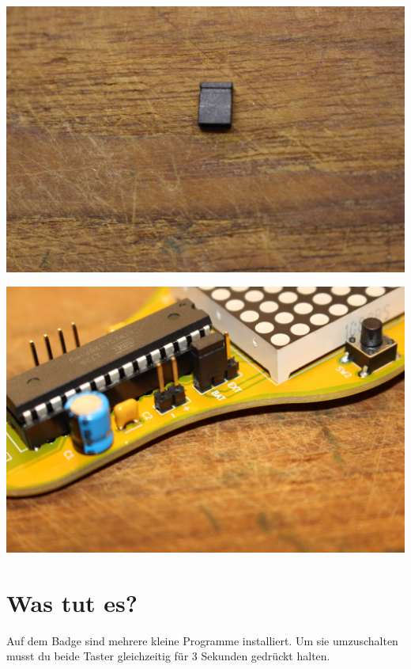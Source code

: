 \documentclass{article}
\begin{document}
\begin{minipage}[b]{0.5\textwidth}
	\includegraphics[width=\textwidth]{Bilder/IMG_5629.JPG}
	\label{fig:}
\end{minipage}
\begin{minipage}[b]{0.5\textwidth}
	\includegraphics[width=\textwidth]{Bilder/IMG_5634.JPG}
	\label{fig:}
\end{minipage}

\section{Was tut es?}

Auf dem Badge sind mehrere kleine Programme installiert. Um sie umzuschalten musst du beide Taster gleichzeitig für 3 Sekunden gedrückt halten.




\end{document}
